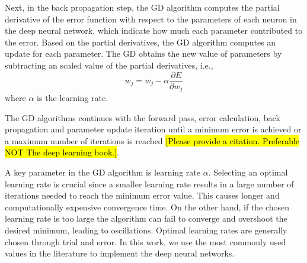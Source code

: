 \documentclass[conference]{IEEEtran}
\begin{document}
Next, in the back propagation step, the GD algorithm 
computes the partial derivative of the error function with respect to the
parameters of each neuron in the deep neural network, which indicate how much each parameter contributed to
the error. Based on the partial derivatives, the GD algorithm computes an update for each parameter. 
The GD  obtains the new value of parameters by subtracting an scaled value of the partial derivatives, i.e.,  
$$w_j = w_j -\alpha \frac{\partial E}{\partial w_j} $$
where  $\alpha$ is the learning rate. 

The GD algorithms continues with the forward pass, error calculation, back propagation and parameter update iteration until a minimum
error is achieved or a maximum number of iterations is reached \cite{} \hl{[Please provide a citation. Preferable NOT The deep
learning book.]}.

A key parameter in the GD algorithm is learning rate $\alpha$.   Selecting an optimal learning
rate is crucial since a smaller learning rate results in a large number of iterations needed to reach the minimum error value. This
causes longer and computationally expensive convergence time. On the other hand, if the chosen learning rate is too large the algorithm
can fail to converge and overshoot the desired minimum, leading to oscillations.  Optimal learning rates are generally chosen through
trial and error. In this work, we use the most commonly used values in the literature to implement the deep neural networks. 





\end{document}
